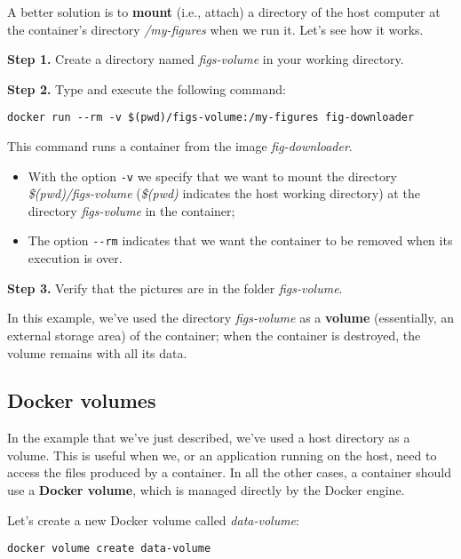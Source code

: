 \documentclass[
]{article}
\theoremstyle{definition}
\theoremstyle{definition}
\theoremstyle{definition}
\theoremstyle{remark}
\begin{document}
A better solution is to \textbf{mount} (i.e., attach)
a directory of the host computer at the container's directory
\emph{/my-figures} when we run it.
Let's see how it works.

\textbf{Step 1.} Create a directory named \emph{figs-volume} in your working directory.

\textbf{Step 2.} Type and execute the following command:

\begin{verbatim}
docker run --rm -v $(pwd)/figs-volume:/my-figures fig-downloader
\end{verbatim}

This command runs a container from the image \emph{fig-downloader}.

\begin{itemize}
\item
  With the option \texttt{-v} we specify that we want to mount the directory
  \emph{\$(pwd)/figs-volume} (\emph{\$(pwd)} indicates the host working directory)
  at the directory \emph{figs-volume} in the container;
\item
  The option \texttt{-\/-rm} indicates that we want the container to be
  removed when its execution is over.
\end{itemize}

\textbf{Step 3.} Verify that the pictures are in the folder \emph{figs-volume}.

In this example, we've used the directory \emph{figs-volume} as a
\textbf{volume} (essentially, an external storage area) of the container;
when the container is destroyed, the volume remains with all its data.

\hypertarget{docker-volumes}{%
\subsection{Docker volumes}\label{docker-volumes}}

In the example that we've just described, we've used a host
directory as a volume.
This is useful when we, or an application running on the host, need
to access the files produced by a container.
In all the other cases, a container should use a \textbf{Docker volume}, which
is managed directly by the Docker engine.

Let's create a new Docker volume called \emph{data-volume}:

\begin{verbatim}
docker volume create data-volume
\end{verbatim}
\end{document}
